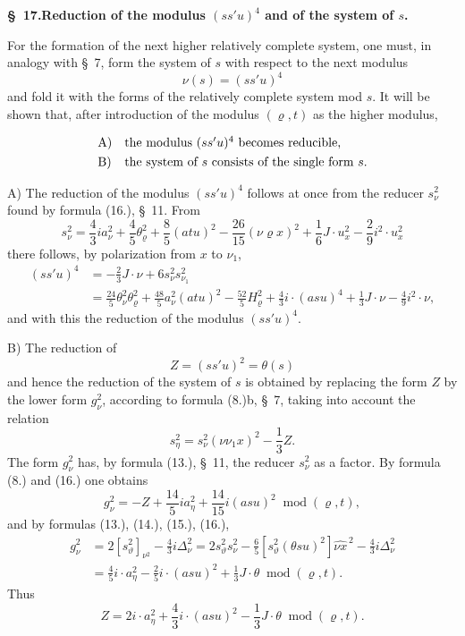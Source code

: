 \documentclass[11pt]{article}
\newcommand{\A}{\Delta}
\newcommand{\modu}[1]{\;\operatorname{mod} #1}
\begin{document}
\begin{center}
\textbf{\S\ 17.\quad Reduction of the modulus $(ss'u)^4$ and of the system of $s$.}
\end{center}

For the formation of the next higher relatively complete system, one must, in analogy with \S\ 7, form the system of $s$ with respect to the next modulus
\[
\nu(s)=(ss'u)^4
\]
and fold it with the forms of the relatively complete system mod $s$. It will be shown that, after introduction of the modulus $(\varrho,t)$ as the higher modulus,
\[
\begin{array}{ll}
\text{A)}&\text{the modulus }(ss'u)^4\text{ becomes reducible,}\vphantom{\dfrac11}\\
\text{B)}&\text{the system of }s\text{ consists of the single form }s.
\end{array}
\]

A) The reduction of the modulus $(ss'u)^4$ follows at once from the reducer $s_\nu^2$ found by formula (16.), \S\ 11. From
\[
 s_\nu^2=\frac43 i a_\nu^2+\frac45\theta_\varrho^2+\frac85(atu)^2-
 \frac{26}{15}(\nu\varrho x)^2+\frac16J\cdot u_x^2-
 \frac29i^2\cdot u_x^2
\]
there follows, by polarization from $x$ to $\nu_1$,
\[
\tag{21}
\begin{aligned}
(ss'u)^4&=-\frac23J\cdot\nu+6s_\nu^2s_{\nu_1}^2\\
&=\frac{24}{5}\theta_\nu^2\theta_\varrho^2+
\frac{48}{5}a_\nu^2(atu)^2-
\frac{52}{5}H_\varrho^2+
\frac43i\cdot(asu)^4+\frac13J\cdot\nu-
\frac49i^2\cdot\nu,
\end{aligned}
\]
and with this the reduction of the modulus $(ss'u)^4$.


B) The reduction of
\[
Z=(ss'u)^2=\theta(s)
\]
and hence the reduction of the system of $s$ is obtained by replacing the form $Z$ by the lower form $g_\nu^2$, according to formula (8.)b, \S\ 7, taking into account the relation
\[
 s_\eta^2=s_\nu^2(\nu\nu_1x)^2-\frac13Z.
\]
The form $g_\nu^2$ has, by formula (13.), \S\ 11, the reducer $s_\nu^2$ as a factor. By formula (8.) and (16.) one obtains
\[
 g_\nu^2=-Z+\frac{14}{5}ia_\eta^2+\frac{14}{15}i(asu)^2
 \modu{(\varrho,t)},
\]
and by formulas (13.), (14.), (15.), (16.),
\[
\begin{aligned}
g_\nu^2&=2[s_\vartheta^2]_{\nu^2}-\frac43 i\A_\nu^2
      =2s_\vartheta^2s_\nu^2-\frac65[s_\vartheta^2(\theta su)^2]\widehat{\nu x}^{\,2}
        -\frac43i\A_\nu^2\\
&=\frac45i\cdot a_\eta^2-\frac25i\cdot(asu)^2+\frac13J\cdot\theta
\modu{(\varrho,t)}.
\end{aligned}
\]
Thus
\[
\tag{23}
 Z=2i\cdot a_\eta^2+\frac43i\cdot(asu)^2-\frac13J\cdot\theta
 \modu{(\varrho,t)}.
\]
\end{document}
